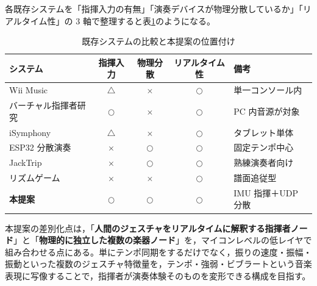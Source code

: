 各既存システムを「指揮入力の有無」「演奏デバイスが物理分散しているか」「リアルタイム性」の 3 軸で整理すると表\ref{tbl:existing}のようになる。

\begin{table}[H]
  \centering
  \caption{既存システムの比較と本提案の位置付け}
  \label{tbl:existing}
  \begin{tabularx}{\textwidth}{lccc>{\small}X}
    \toprule
    システム & 指揮入力 & 物理分散 & リアルタイム性 & 備考 \\
    \midrule
    Wii Music        & $\triangle$ & $\times$ & $\bigcirc$ & 単一コンソール内 \\
    バーチャル指揮者研究 & $\bigcirc$ & $\times$ & $\bigcirc$ & PC 内音源が対象 \\
    iSymphony        & $\triangle$ & $\times$ & $\bigcirc$ & タブレット単体 \\
    ESP32 分散演奏   & $\times$ & $\bigcirc$ & $\bigcirc$ & 固定テンポ中心 \\
    JackTrip         & $\times$ & $\bigcirc$ & $\bigcirc$ & 熟練演奏者向け \\
    リズムゲーム     & $\times$ & $\times$ & $\bigcirc$ & 譜面追従型 \\
    \midrule
    \textbf{本提案}  & $\bigcirc$ & $\bigcirc$ & $\bigcirc$ & IMU 指揮＋UDP 分散 \\
    \bottomrule
  \end{tabularx}
\end{table}

本提案の差別化点は，「\textbf{人間のジェスチャをリアルタイムに解釈する指揮者ノード}」と「\textbf{物理的に独立した複数の楽器ノード}」を，マイコンレベルの低レイヤで組み合わせる点にある。単にテンポ同期をするだけでなく，振りの速度・振幅・振動といった複数のジェスチャ特徴量を，テンポ・強弱・ビブラートという音楽表現に写像することで，指揮者が演奏体験そのものを変形できる構成を目指す。
